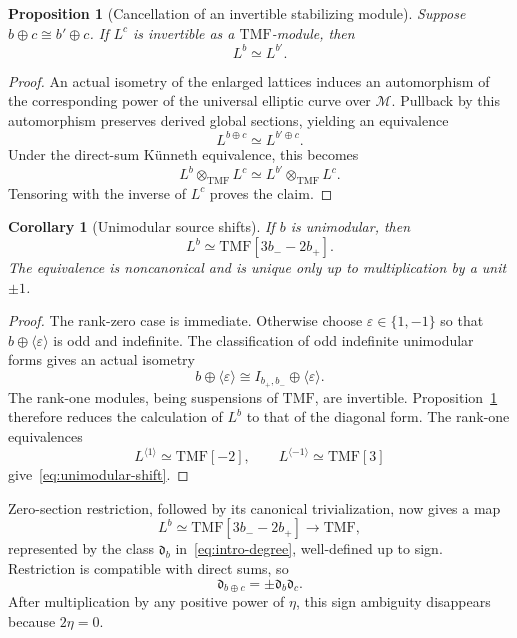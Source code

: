 \documentclass[11pt,a4paper]{amsart}
\newcommand{\TMF}{\mathrm{TMF}}
\newcommand{\cM}{\mathcal M}
\newcommand{\dclass}{\mathfrak d}
\theoremstyle{plain}
\newtheorem{proposition}[theorem]{Proposition}
\newtheorem{corollary}[theorem]{Corollary}
\theoremstyle{definition}
\theoremstyle{remark}
\begin{document}
\begin{proposition}[Cancellation of an invertible stabilizing module]\label{prop:module-cancel}
Suppose $b\oplus c\cong b'\oplus c$. If $L^c$ is invertible
as a $\TMF$-module, then
\[
 L^b\simeq L^{b'}.
\]
\end{proposition}

\begin{proof}
An actual isometry of the enlarged lattices induces an automorphism
of the corresponding power of the universal elliptic curve over
$\cM$. Pullback by this automorphism preserves derived global
sections, yielding an equivalence
\[
 L^{b\oplus c}\simeq L^{b'\oplus c}.
\]
Under the direct-sum K\"unneth equivalence, this becomes
\[
 L^b\otimes_{\TMF}L^c\simeq L^{b'}\otimes_{\TMF}L^c.
\]
Tensoring with the inverse of $L^c$ proves the claim.
\end{proof}

\begin{corollary}[Unimodular source shifts]\label{cor:unimodular-shift}
If $b$ is unimodular, then
\begin{equation}\label{eq:unimodular-shift}
 L^b\simeq\TMF[3b_- -2b_+].
\end{equation}
The equivalence is noncanonical and is unique only up to
multiplication by a unit $\pm1$.
\end{corollary}

\begin{proof}
The rank-zero case is immediate. Otherwise choose
$\varepsilon\in\{1,-1\}$ so that
$b\oplus\langle\varepsilon\rangle$ is odd and indefinite.
The classification of odd indefinite unimodular forms
\cite[Chapter~II]{MH} gives an actual isometry
\[
 b\oplus\langle\varepsilon\rangle
 \cong
 I_{b_+,b_-}\oplus\langle\varepsilon\rangle.
\]
The rank-one modules, being suspensions of $\TMF$, are invertible.
Proposition~\ref{prop:module-cancel} therefore reduces the calculation
of $L^b$ to that of the diagonal form. The rank-one equivalences
\[
 L^{\langle1\rangle}\simeq\TMF[-2],
 \qquad
 L^{\langle-1\rangle}\simeq\TMF[3]
\]
give~\eqref{eq:unimodular-shift}.
\end{proof}

Zero-section restriction, followed by its canonical trivialization,
now gives a map
\[
 L^b\simeq\TMF[3b_- -2b_+]\longrightarrow\TMF,
\]
represented by the class $\dclass_b$ in~\eqref{eq:intro-degree},
well-defined up to sign. Restriction is compatible with direct
sums, so
\begin{equation}\label{eq:multiplicativity-sign}
 \dclass_{b\oplus c}=\pm\dclass_b\dclass_c.
\end{equation}
After multiplication by any positive power of $\eta$, this sign
ambiguity disappears because $2\eta=0$.
\end{document}
